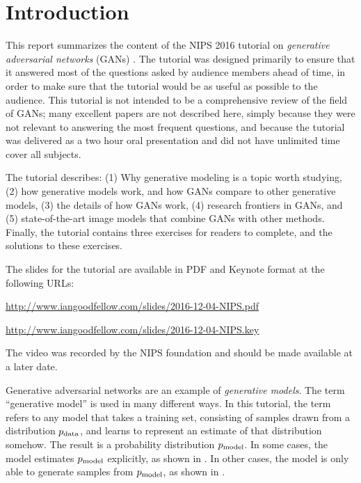 \section*{Introduction}

This report summarizes the content of the NIPS 2016 tutorial on {\em generative adversarial networks}
(GANs) \citep{Goodfellow-et-al-NIPS2014-small}.
The tutorial was designed primarily to ensure that it answered most of
the questions asked by audience members ahead of time, in order to make sure
that the tutorial would be as useful as possible to the audience.
This tutorial is not intended to be a comprehensive review of the field
of GANs; many excellent papers are not described here, simply because
they were not relevant to answering the most frequent questions, and because
the tutorial was delivered as a two hour oral presentation and did not
have unlimited time cover all subjects.

The tutorial describes:
(1) Why generative modeling is a topic worth studying,
(2) how generative models work, and how GANs compare to other generative models,
(3) the details of how GANs work,
(4) research frontiers in GANs, and
(5) state-of-the-art image models that combine GANs with other methods.
Finally, the tutorial contains three exercises for readers to complete,
and the solutions to these exercises.

The slides for the tutorial are available in PDF and Keynote format at the following URLs:

\url{http://www.iangoodfellow.com/slides/2016-12-04-NIPS.pdf}

\url{http://www.iangoodfellow.com/slides/2016-12-04-NIPS.key}

The video was recorded by the NIPS foundation and should be made available at a later date.

Generative adversarial networks are an example of {\em generative models}.
The term ``generative model'' is used in many different ways.
In this tutorial, the term refers to any model that takes a training set,
consisting of samples drawn from a distribution $p_{\rm{data}}$, and learns to
represent an estimate of that distribution somehow.
The result is a probability distribution $p_{\rm{model}}$.
In some cases, the model estimates $p_{\rm{model}}$ explicitly, as shown in
.
In other cases, the model is only able to generate samples from
$p_{\rm{model}}$, as shown in .

